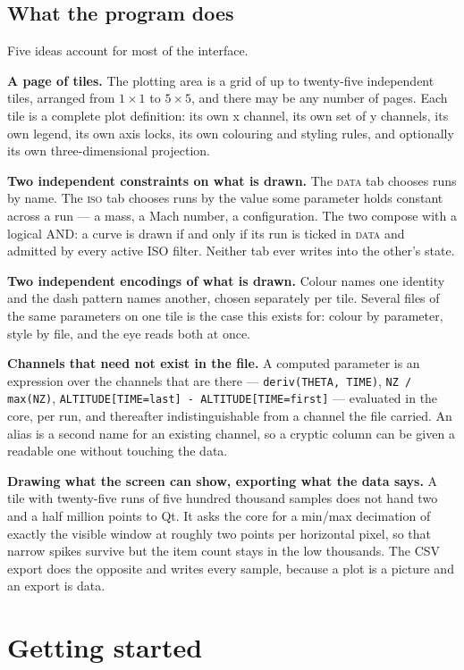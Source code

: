 \documentclass[11pt,a4paper,oneside]{report}
\newcommand{\code}[1]{\texttt{#1}}
\newcommand{\tab}[1]{\textsc{#1}}
\begin{document}
\section{What the program does}

Five ideas account for most of the interface.

\textbf{A page of tiles.} The plotting area is a grid of up to twenty-five
independent tiles, arranged from $1 \times 1$ to $5 \times 5$, and there may be
any number of pages. Each tile is a complete plot definition: its own x channel,
its own set of y channels, its own legend, its own axis locks, its own colouring
and styling rules, and optionally its own three-dimensional projection.

\textbf{Two independent constraints on what is drawn.} The \tab{data} tab
chooses runs by name. The \tab{iso} tab chooses runs by the value some parameter
holds constant across a run --- a mass, a Mach number, a configuration. The two
compose with a logical AND: a curve is drawn if and only if its run is ticked in
\tab{data} and admitted by every active ISO filter. Neither tab ever writes into
the other's state.

\textbf{Two independent encodings of what is drawn.} Colour names one identity
and the dash pattern names another, chosen separately per tile. Several files of
the same parameters on one tile is the case this exists for: colour by
parameter, style by file, and the eye reads both at once.

\textbf{Channels that need not exist in the file.} A computed parameter is an
expression over the channels that are there ---
\code{deriv(THETA, TIME)}, \code{NZ / max(NZ)},
\code{ALTITUDE[TIME=last] - ALTITUDE[TIME=first]} --- evaluated in the core,
per run, and thereafter indistinguishable from a channel the file carried. An
alias is a second name for an existing channel, so a cryptic column can be given
a readable one without touching the data.

\textbf{Drawing what the screen can show, exporting what the data says.} A tile
with twenty-five runs of five hundred thousand samples does not hand two and a
half million points to Qt. It asks the core for a min/max decimation of exactly
the visible window at roughly two points per horizontal pixel, so that narrow
spikes survive but the item count stays in the low thousands. The CSV export
does the opposite and writes every sample, because a plot is a picture and an
export is data.

\chapter{Getting started}
\end{document}
